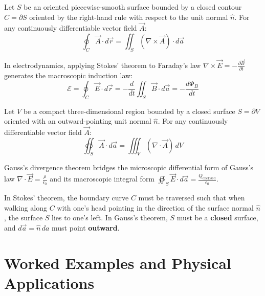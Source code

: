 \begin{maththeorem}
Let $S$ be an oriented piecewise-smooth surface bounded by a closed contour $C = \partial S$ oriented by the right-hand rule with respect to the unit normal $\hat{n}$. For any continuously differentiable vector field $\vec{A}$:
\begin{equation}
\oint_C \vec{A} \cdot d\vec{r} = \iint_S (\nabla \times \vec{A}) \cdot d\vec{a}
\end{equation}
\end{maththeorem}
In electrodynamics, applying Stokes' theorem to Faraday's law $\nabla \times \vec{E} = -\frac{\partial \vec{B}}{\partial t}$ generates the macroscopic induction law:
\begin{equation}
\mathcal{E} = \oint_C \vec{E} \cdot d\vec{r} = -\frac{d}{dt}\iint_S \vec{B} \cdot d\vec{a} = -\frac{d\Phi_B}{dt}
\end{equation}

\begin{maththeorem}
Let $V$ be a compact three-dimensional region bounded by a closed surface $S = \partial V$ oriented with an outward-pointing unit normal $\hat{n}$. For any continuously differentiable vector field $\vec{A}$:
\begin{equation}
\oiint_S \vec{A} \cdot d\vec{a} = \iiint_V (\nabla \cdot \vec{A})\,dV
\end{equation}
\end{maththeorem}
Gauss's divergence theorem bridges the microscopic differential form of Gauss's law $\nabla \cdot \vec{E} = \frac{\rho}{\epsilon_0}$ and its macroscopic integral form $\oiint_S \vec{E} \cdot d\vec{a} = \frac{Q_{\text{enclosed}}}{\epsilon_0}$.

\begin{pitfallbox}
In Stokes' theorem, the boundary curve $C$ must be traversed such that when walking along $C$ with one's head pointing in the direction of the surface normal $\hat{n}$, the surface $S$ lies to one's left. In Gauss's theorem, $S$ must be a \textbf{closed} surface, and $d\vec{a} = \hat{n}\,da$ must point \textbf{outward}.
\end{pitfallbox}

\section{Worked Examples and Physical Applications}

